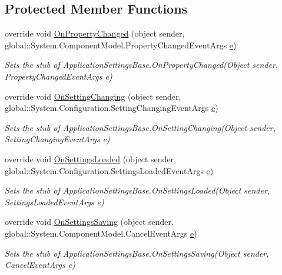 \subsection*{Protected Member Functions}
\begin{DoxyCompactItemize}
\item 
override void \hyperlink{class_system_1_1_configuration_1_1_fakes_1_1_stub_application_settings_base_a47043be8991b77f04a3dda44c7fc0a2b}{On\-Property\-Changed} (object sender, global\-::\-System.\-Component\-Model.\-Property\-Changed\-Event\-Args \hyperlink{jquery-1_810_82_8min_8js_a2c038346d47955cbe2cb91e338edd7e1}{e})
\begin{DoxyCompactList}\small\item\em Sets the stub of Application\-Settings\-Base.\-On\-Property\-Changed(\-Object sender, Property\-Changed\-Event\-Args e)\end{DoxyCompactList}\item 
override void \hyperlink{class_system_1_1_configuration_1_1_fakes_1_1_stub_application_settings_base_a5acf5f3921d90e3343ff7bc4eab4198f}{On\-Setting\-Changing} (object sender, global\-::\-System.\-Configuration.\-Setting\-Changing\-Event\-Args \hyperlink{jquery-1_810_82_8min_8js_a2c038346d47955cbe2cb91e338edd7e1}{e})
\begin{DoxyCompactList}\small\item\em Sets the stub of Application\-Settings\-Base.\-On\-Setting\-Changing(\-Object sender, Setting\-Changing\-Event\-Args e)\end{DoxyCompactList}\item 
override void \hyperlink{class_system_1_1_configuration_1_1_fakes_1_1_stub_application_settings_base_a058e52c59256d4d6c5d5090da3860cb3}{On\-Settings\-Loaded} (object sender, global\-::\-System.\-Configuration.\-Settings\-Loaded\-Event\-Args \hyperlink{jquery-1_810_82_8min_8js_a2c038346d47955cbe2cb91e338edd7e1}{e})
\begin{DoxyCompactList}\small\item\em Sets the stub of Application\-Settings\-Base.\-On\-Settings\-Loaded(\-Object sender, Settings\-Loaded\-Event\-Args e)\end{DoxyCompactList}\item 
override void \hyperlink{class_system_1_1_configuration_1_1_fakes_1_1_stub_application_settings_base_a05fa56f3fbc1230f5829bd933652ea81}{On\-Settings\-Saving} (object sender, global\-::\-System.\-Component\-Model.\-Cancel\-Event\-Args \hyperlink{jquery-1_810_82_8min_8js_a2c038346d47955cbe2cb91e338edd7e1}{e})
\begin{DoxyCompactList}\small\item\em Sets the stub of Application\-Settings\-Base.\-On\-Settings\-Saving(\-Object sender, Cancel\-Event\-Args e)\end{DoxyCompactList}\end{DoxyCompactItemize}
